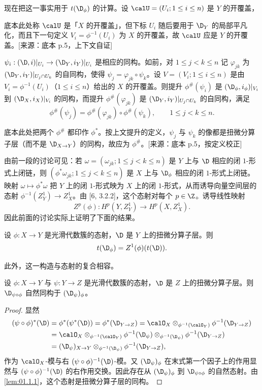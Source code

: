 现在把这一事实用于 $t(\D_\phi)$ 的计算。设 $\calU=(U_i;1\le i\le n)$ 是 $Y$ 的开覆盖，
\begin{annote}
底本此处称 $\calU$ 是「$X$ 的开覆盖」，但下标 $U_i$ 随后要用于 $\D_Y$ 的局部平凡化，而且下一句定义 $V_i=\phi^{-1}(U_i)$ 为 $X$ 的开覆盖，故 $\calU$ 应是 $Y$ 的开覆盖。[来源：底本 p.5，上下文自证]
\end{annote}
$\psi_i:(\D,i)|_{U_i}\to(\D_Y,i_Y)|_{U_i}$ 是相应的同构。如前，对 $1\le j<k\le n$ 记 $\varphi_{jk}$ 为 $(\D_Y,i_Y)|_{U_j\cap U_k}$ 的自同构，使得 $\psi_j=\varphi_{jk}\circ\psi_k$。设 $V=(V_i;1\le i\le n)$ 是由 $V_i=\phi^{-1}(U_i)$（$1\le i\le n$）给出的 $X$ 的开覆盖。则提升 $\phi^\#(\psi_i)$ 是 $(\D_\phi,i_\phi)|_{V_i}$ 到 $(\D_X,i_X)|_{V_i}$ 的同构，而提升 $\phi^\#(\varphi_{jk})$ 是 $(\D_Y,i_Y)|_{U_j\cap U_k}$ 的自同构，满足
$$\phi^\#(\psi_j)=\phi^\#(\varphi_{jk})\circ\phi^\#(\psi_k),\qquad 1\le j<k\le n.$$
\begin{annote}
底本此处把两个 $\phi^\#$ 都印作 $\phi^*$。按上文提升的定义，$\psi_j$ 与 $\psi_k$ 的像都是扭微分算子层（而不是 $\D_{X\to Y}$）的同构，故应为 $\phi^\#$。[来源：底本 p.5，按定义校正]
\end{annote}
由前一段的讨论可见：若 $\omega=(\omega_{jk};1\le j<k\le n)$ 是 $Y$ 上与 $\D$ 相应的闭 $1$-形式上闭链，则 $(\phi^*\omega_{jk};1\le j<k\le n)$ 是 $X$ 上与 $\D_\phi$ 相应的闭 $1$-形式上闭链。映射 $\omega\mapsto\phi^*\omega$ 把 $Y$ 上的闭 $1$-形式映为 $X$ 上的闭 $1$-形式，从而诱导向量空间层的态射 $\phi^{-1}(Z^1_Y)\to Z^1_X$。由 [6, 3.2.2]，这个态射对每个 $p\in\Z_+$ 诱导线性映射
$$Z^p(\phi):H^p(Y,Z^1_Y)\longrightarrow H^p(X,Z^1_X).$$
因此前面的讨论实际上证明了下面的结果。

\begin{proposition}\label{prop:01.1.5}
设 $\phi:X\to Y$ 是光滑代数簇的态射，$\D$ 是 $Y$ 上的扭微分算子层。则
$$t(\D_\phi)=Z^1(\phi)(t(\D)).$$
\end{proposition}

此外，这一构造与态射的复合相容。

\begin{proposition}\label{prop:01.1.6}
设 $\phi:X\to Y$ 与 $\psi:Y\to Z$ 是光滑代数簇的态射，$\D$ 是 $Z$ 上的扭微分算子层。则 $\D_{\psi\circ\phi}$ 自然同构于 $(\D_\psi)_\phi$。
\end{proposition}

\begin{proof}
显然
\begin{align*}
(\psi\circ\phi)^*(\D)&=\phi^*(\psi^*(\D))=\phi^*(\D_{Y\to Z})=\calO_X\otimes_{\phi^{-1}(\calO_Y)}\phi^{-1}(\D_{Y\to Z})\\
&=\calO_X\otimes_{\phi^{-1}(\calO_Y)}\phi^{-1}(\D_\psi)\otimes_{\phi^{-1}(\D_\psi)}\phi^{-1}(\D_{Y\to Z})\\
&=(\D_\psi)_{X\to Y}\otimes_{\phi^{-1}(\D_\psi)}\phi^{-1}(\D_{Y\to Z}),
\end{align*}
作为 $\calO_X$-模与右 $(\psi\circ\phi)^{-1}(\D)$-模。又 $(\D_\psi)_\phi$ 在末式第一个因子上的作用显然与 $(\psi\circ\phi)^{-1}(\D)$ 的右作用交换。因此存在从 $(\D_\psi)_\phi$ 到 $\D_{\psi\circ\phi}$ 的自然态射。由 \ref{lem:01.1.1}，这个态射是扭微分算子层的同构。
\end{proof}

